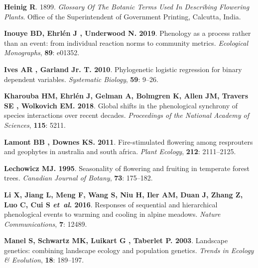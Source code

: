 \documentclass[11pt]{article}
\begin{document}
\begin{thebibliography}{48}
{\bf Heinig R}. 1899.
\newblock \emph{Glossary Of The Botanic Terms Used In Describing Flowering
  Plants}.
\newblock Office of the Superintendent of Government Printing, Calcutta, India.

{\bf Inouye BD, Ehrl{\'e}n J , Underwood N}{\bf . 2019}.
\newblock Phenology as a process rather than an event: from individual reaction
  norms to community metrics.
\newblock \emph{Ecological Monographs}, {\bf 89}: e01352.

{\bf Ives AR , Garland Jr. T}{\bf . 2010}.
\newblock Phylogenetic logistic regression for binary dependent variables.
\newblock \emph{Systematic Biology}, {\bf 59}: 9--26.

{\bf Kharouba HM, Ehrl{\'e}n J, Gelman A, Bolmgren K, Allen JM, Travers SE ,
  Wolkovich EM}{\bf . 2018}.
\newblock Global shifts in the phenological synchrony of species interactions
  over recent decades.
\newblock \emph{Proceedings of the National Academy of Sciences}, {\bf 115}:
  5211.

{\bf Lamont BB , Downes KS}{\bf . 2011}.
\newblock Fire-stimulated flowering among resprouters and geophytes in
  australia and south africa.
\newblock \emph{Plant Ecology}, {\bf 212}: 2111--2125.

{\bf Lechowicz MJ}{\bf . 1995}.
\newblock Seasonality of flowering and fruiting in temperate forest trees.
\newblock \emph{Canadian Journal of Botany}, {\bf 73}: 175--182.

{\bf Li X, Jiang L, Meng F, Wang S, Niu H, Iler AM, Duan J, Zhang Z, Luo C, Cui
  S \emph{et~al}}{\bf . 2016}.
\newblock Responses of sequential and hierarchical phenological events to
  warming and cooling in alpine meadows.
\newblock \emph{Nature Communications}, {\bf 7}: 12489.

{\bf Manel S, Schwartz MK, Luikart G , Taberlet P}{\bf . 2003}.
\newblock Landscape genetics: combining landscape ecology and population
  genetics.
\newblock \emph{Trends in Ecology \& Evolution}, {\bf 18}: 189--197.


\end{thebibliography}
\end{document}
